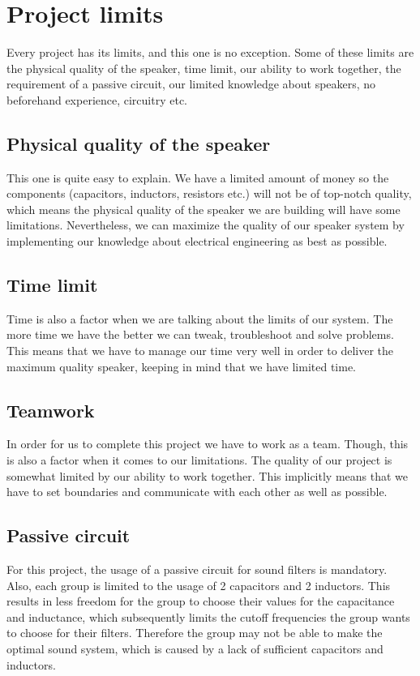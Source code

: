 \newpage
\section{Project limits}

Every project has its limits, and this one is no exception. Some of these limits are the physical quality of the speaker, time limit, our ability to work together, the requirement of a passive circuit, our limited knowledge about speakers, no beforehand experience, circuitry etc. 


\subsection{Physical quality of the speaker}
This one is quite easy to explain. We have a limited amount of money so the components (capacitors, inductors, resistors etc.) will not be of top-notch quality, which means the physical quality of the speaker we are building will have some limitations. Nevertheless, we can maximize the quality of our speaker system by implementing our knowledge about electrical engineering as best as possible.

\subsection{Time limit}
Time is also a factor when we are talking about the limits of our system. The more time we have the better we can tweak, troubleshoot and solve problems. This means that we have to manage our time very well in order to deliver the maximum quality speaker, keeping in mind that we have limited time.

\subsection{Teamwork}
In order for us to complete this project we have to work as a team. Though, this is also a factor when it comes to our limitations. The quality of our project is somewhat limited by our ability to work together. This implicitly means that we have to set boundaries and communicate with each other as well as possible.

\subsection{Passive circuit}
For this project, the usage of a passive circuit for sound filters is mandatory. Also, each group is limited to the usage of 2 capacitors and 2 inductors. This results in less freedom for the group to choose their values for the capacitance and inductance, which subsequently limits the cutoff frequencies the group wants to choose for their filters. Therefore the group may not be able to make the optimal sound system, which is caused by a lack of sufficient capacitors and inductors.

